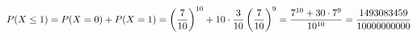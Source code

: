 \documentclass[preview]{standalone}
\begin{document}
\begin{align*}
\special{dvisvgm:raw <g id='unique000'>}P(X\le1)=P(X=0)+P(X=1)=\left(\frac7{10}\right)^{10}+10\cdot\frac3{10}\left(\frac7{10}\right)^9=\frac{7^{10}+30\cdot7^9}{10^{10}}=\frac{1493083459}{10000000000}\special{dvisvgm:raw </g>}
\end{align*}
\end{document}
